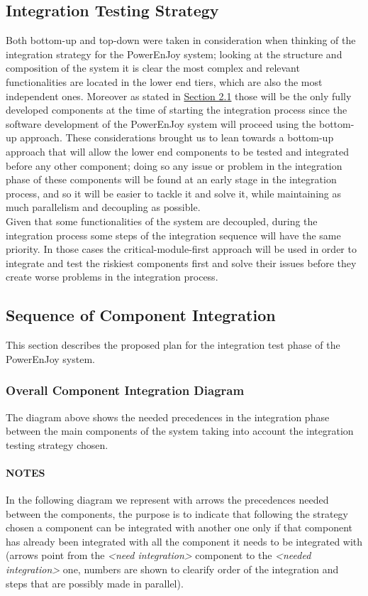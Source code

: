 \subsection{Integration Testing Strategy} \label{sec:intStrategy}
Both bottom-up and top-down were taken in consideration when thinking of the integration strategy for the PowerEnJoy system; looking at the structure and composition of the system it is clear the most complex and relevant functionalities are located in the lower end tiers, which are also the most independent ones. Moreover as stated in \hyperref[sec:entryCriteria]{Section 2.1} those will be the only fully developed components at the time of starting the integration process since the software development of the PowerEnJoy system will proceed using the bottom-up approach. These considerations brought us to lean towards a bottom-up approach that will allow the lower end components to be tested and integrated before any other component; doing so any issue or problem in the integration phase of these components will be found at an early stage in the integration process, and so it will be easier to tackle it and solve it, while maintaining as much parallelism and decoupling as possible.\\
Given that some functionalities of the system are decoupled, during the integration process some steps of the integration sequence will have the same priority. In those cases the critical-module-first approach will be used in order to integrate and test the riskiest  components first and solve their issues before they create worse problems in the integration process.

\subsection{Sequence of Component Integration}
This section describes the proposed plan for the integration test phase of the PowerEnJoy system.

\subsubsection{Overall Component Integration Diagram}  \label{sec:overallPrecedences}
The diagram above shows the needed precedences in the integration phase between the main components of the system taking into account the integration testing strategy chosen.

\paragraph{NOTES} In the following diagram we represent with arrows the precedences needed between the components, the purpose is to indicate that following the strategy chosen a component can be integrated with another one only if that component has already been integrated with all the component it needs to be integrated with (arrows point from the \emph{<need integration>} component to the \emph{<needed integration>} one, numbers are shown to clearify order of the integration and steps that are possibly made in parallel).\\


